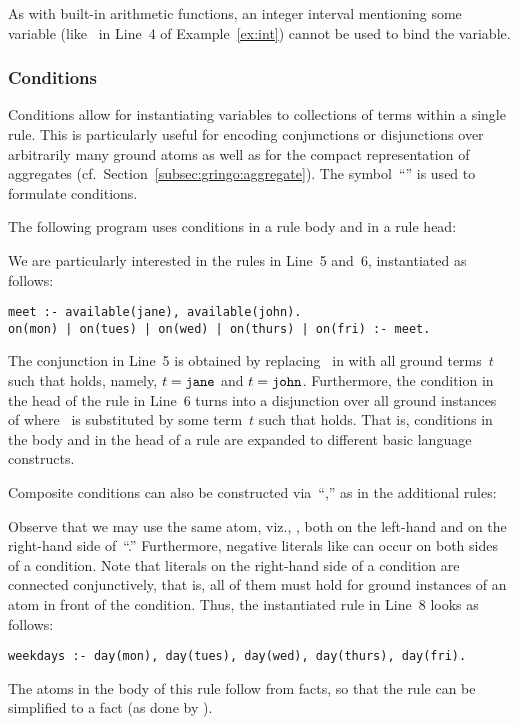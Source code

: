 As with built-in arithmetic functions,
an integer interval mentioning some variable (like~ in Line~4 of Example~\ref{ex:int})
cannot be used to bind the variable.


\subsubsection{Conditions}\label{subsec:gringo:condition}

Conditions allow for instantiating variables to
collections of terms within a single rule.
This is particularly useful for encoding conjunctions or disjunctions over
arbitrarily many ground atoms as well as for the compact representation of aggregates
(cf.\ Section~\ref{subsec:gringo:aggregate}).
The symbol~``\code{:}'' is used to formulate conditions.

\begin{example}\label{ex:cond}
The following program uses conditions in a rule body and in a rule head:
%

%
We are particularly interested in the rules in Line~5 and~6,
instantiated as follows:%
%
\begin{lstlisting}[firstnumber=5]
meet :- available(jane), available(john).
on(mon) | on(tues) | on(wed) | on(thurs) | on(fri) :- meet.
\end{lstlisting}
%
The conjunction in Line~5 is obtained by replacing~ in
 with all ground terms~$t$ such that
 holds, namely, $t=\texttt{jane}$ and $t=\texttt{john}$.
Furthermore, the condition in the head of the rule in Line~6 turns into
a disjunction over all ground instances of
 where~ is substituted by some term~$t$
such that
 holds.
That is, conditions in the body and in the head of a rule
are expanded to different basic language constructs.

Composite conditions can also be constructed via~``\code{:},''
as in the additional rules:
%

%
Observe that we may use the same atom, viz., ,
both on the left-hand and on the right-hand side of~``\code{:}.''
Furthermore, negative literals like 
can occur on both sides of a condition.
Note that literals on the right-hand side of a condition are connected conjunctively, that is,
all of them must hold for ground instances of an atom in front
of the condition.
Thus, the instantiated rule in Line~8 looks as follows:
%
\begin{lstlisting}[firstnumber=8]
weekdays :- day(mon), day(tues), day(wed), day(thurs), day(fri).
\end{lstlisting}
%
The atoms in the body of this rule follow from facts, so that
the rule can be simplified to a fact 
(as done by \gringo).
\eexample
\end{example}

